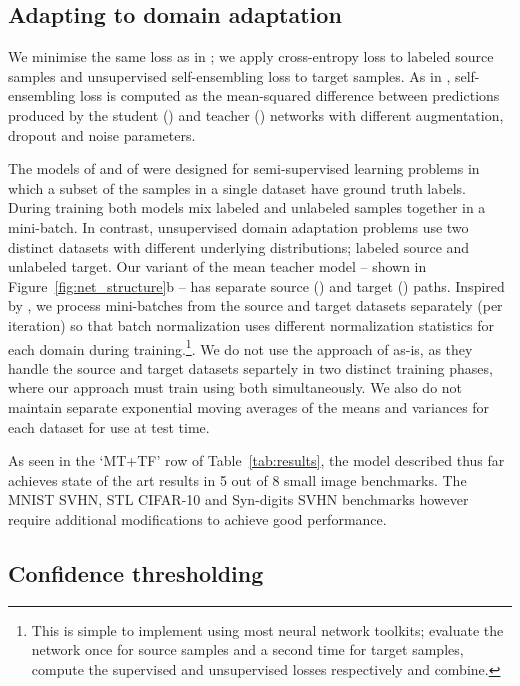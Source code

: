 \documentclass{article}
\begin{document}
\subsection{Adapting to domain adaptation}
\label{sec:method:domadapt}

We minimise the same loss as in \cite{Tarvainen:Mean}; we apply cross-entropy loss to labeled source samples and unsupervised self-ensembling loss to target samples. As in \cite{Tarvainen:Mean}, self-ensembling loss is computed as the mean-squared difference between predictions produced by the student () and teacher () networks with different augmentation, dropout and noise parameters.

The models of \cite{Tarvainen:Mean} and of \cite{Laine:Temporal} were designed for semi-supervised learning problems in which a subset of the samples in a single dataset have ground truth labels. During training both models mix labeled and unlabeled samples together in a mini-batch. In contrast, unsupervised domain adaptation problems use two distinct datasets with different underlying distributions; labeled source and unlabeled target. Our variant of the mean teacher model -- shown in Figure~\ref{fig:net_structure}b -- has separate source () and target () paths. Inspired by \cite{Li:AdaBN}, we process mini-batches from the source and target datasets separately (per iteration) so that batch normalization uses different normalization statistics for each domain during training.\footnote{This is simple to implement using most neural network toolkits; evaluate the network once for source samples and a second time for target samples, compute the supervised and unsupervised losses respectively and combine.}. We do not use the approach of \cite{Li:AdaBN} as-is, as they handle the source and target datasets separtely in two distinct training phases, where our approach must train using both simultaneously. We also do not maintain separate exponential moving averages of the means and variances for each dataset for use at test time.

As seen in the `MT+TF' row of Table~\ref{tab:results}, the model described thus far achieves state of the art results in 5 out of 8 small image benchmarks. The MNIST  SVHN, STL  CIFAR-10 and Syn-digits  SVHN benchmarks however require additional modifications to achieve good performance.



\subsection{Confidence thresholding}
\label{sec:method:confthresh}
\end{document}
